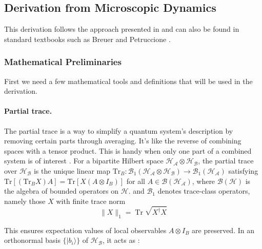 \subsection{Derivation from Microscopic Dynamics}
\label{subsec:Derivation_redfield_eq}

\noindent
This derivation follows the approach presented in \cite{manzano2020shortintroductionlindblad} and can also be found in standard textbooks such as Breuer and Petruccione \cite{breuerpetruccione2009theoryopenquantum}. 

\subsubsection{Mathematical Preliminaries}
\label{subsubsec:preliminaries_tools}

First we need a few mathematical tools and definitions that will be used in the derivation.
\noindent
\paragraph{Partial trace.}

\noindent
The partial trace is a way to simplify a quantum system's description by removing certain parts through averaging. It's like the reverse of combining spaces with a tensor product. This is handy when only one part of a combined system is of interest \cite{lambertetal2024qutip5quantum}.
For a bipartite Hilbert space $\mathcal{H_A} \otimes \mathcal{H_B}$, the partial trace over $\mathcal{H_B}$ is the unique linear map $\mathrm{Tr}_B: \mathcal{B}_1(\mathcal{H_A} \otimes \mathcal{H_B}) \to \mathcal{B}_1(\mathcal{H_A})$ satisfying $\mathrm{Tr}[(\mathrm{Tr}_B X) A] = \mathrm{Tr}[X (A \otimes I_B)]$ for all $A \in \mathcal{B}(\mathcal{H_A})$, where  $\mathcal{B}(\mathcal{H})$ is the algebra of bounded operators on $\mathcal{H}$.
and $\mathcal{B}_1$ denotes trace-class operators, namely those $X$ with finite trace norm 
\[ 
  \| X \|_1 = \operatorname{Tr} \sqrt{X^\dagger X} 
\]

\noindent
This ensures expectation values of local observables $A \otimes I_B$ are preserved. In an orthonormal basis $\{|b_i\rangle\}$ of $\mathcal{H_B}$, it acts as \cite{steebhardy2018problemssolutionsquantum}:

